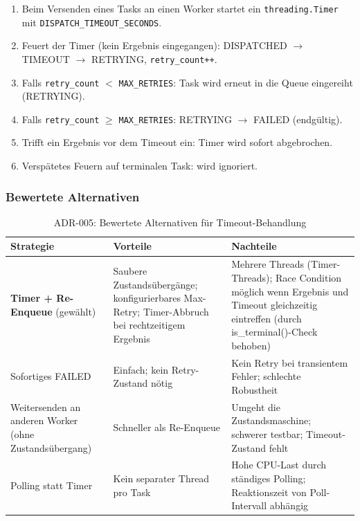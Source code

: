 \begin{enumerate}
  \item Beim Versenden eines Tasks an einen Worker startet ein
        \texttt{threading.Timer} mit \texttt{DISPATCH\_TIMEOUT\_SECONDS}.
  \item Feuert der Timer (kein Ergebnis eingegangen):
        DISPATCHED $\rightarrow$ TIMEOUT $\rightarrow$ RETRYING,
        \texttt{retry\_count++}.
  \item Falls \texttt{retry\_count} $<$ \texttt{MAX\_RETRIES}:
        Task wird erneut in die Queue eingereiht (RETRYING).
  \item Falls \texttt{retry\_count} $\geq$ \texttt{MAX\_RETRIES}:
        RETRYING $\rightarrow$ FAILED (endgültig).
  \item Trifft ein Ergebnis vor dem Timeout ein: Timer wird sofort
        abgebrochen.
  \item Verspätetes Feuern auf terminalen Task: wird ignoriert.
\end{enumerate}

\subsubsection*{Bewertete Alternativen}

\begin{table}[H]
\centering
\begin{tabular}{m{4.5cm} m{5.2cm} m{6.25cm}}
\toprule
\textbf{Strategie} & \textbf{Vorteile} & \textbf{Nachteile} \\
\midrule
\textbf{Timer + Re-Enqueue} (gewählt) &
  Saubere Zustandsübergänge; konfigurierbares Max-Retry;
  Timer-Abbruch bei rechtzeitigem Ergebnis &
  Mehrere Threads (Timer-Threads); Race Condition möglich
  wenn Ergebnis und Timeout gleichzeitig eintreffen
  (durch is\_terminal()-Check behoben) \\
\midrule
Sofortiges FAILED &
  Einfach; kein Retry-Zustand nötig &
  Kein Retry bei transientem Fehler; schlechte Robustheit \\
\midrule
Weitersenden an anderen Worker (ohne Zustandsübergang) &
  Schneller als Re-Enqueue &
  Umgeht die Zustandsmaschine; schwerer testbar;
  Timeout-Zustand fehlt \\
\midrule
Polling statt Timer &
  Kein separater Thread pro Task &
  Hohe CPU-Last durch ständiges Polling;
  Reaktionszeit von Poll-Intervall abhängig \\
\bottomrule
\end{tabular}
\caption{ADR-005: Bewertete Alternativen für Timeout-Behandlung}
\end{table}

